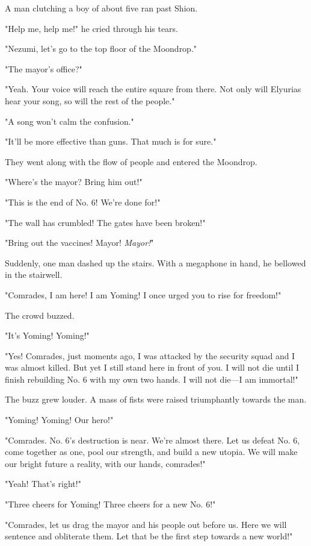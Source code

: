 

A man clutching a boy of about five ran past Shion.

"Help me, help me!" he cried through his tears.

"Nezumi, let's go to the top floor of the Moondrop."

"The mayor's office?"

"Yeah. Your voice will reach the entire square from there. Not only will
Elyurias hear your song, so will the rest of the people."

"A song won't calm the confusion."

"It'll be more effective than guns. That much is for sure."

They went along with the flow of people and entered the Moondrop.

"Where's the mayor? Bring him out!"

"This is the end of No. 6! We're done for!"

"The wall has crumbled! The gates have been broken!"

"Bring out the vaccines! Mayor! \emph{Mayor!}"

Suddenly, one man dashed up the stairs. With a megaphone in hand, he
bellowed in the stairwell.

"Comrades, I am here! I am Yoming! I once urged you to rise for
freedom!"

The crowd buzzed.

"It's Yoming! Yoming!"

"Yes! Comrades, just moments ago, I was attacked by the security squad
and I was almost killed. But yet I still stand here in front of you. I
will not die until I finish rebuilding No. 6 with my own two hands. I
will not die---I am immortal!"

The buzz grew louder. A mass of fists were raised triumphantly towards
the man.

"Yoming! Yoming! Our hero!"

"Comrades. No. 6's destruction is near. We're almost there. Let us
defeat No. 6, come together as one, pool our strength, and build a new
utopia. We will make our bright future a reality, with our hands,
comrades!"

"Yeah! That's right!"

"Three cheers for Yoming! Three cheers for a new No. 6!"

"Comrades, let us drag the mayor and his people out before us. Here we
will sentence and obliterate them. Let that be the first step towards a
new world!"

